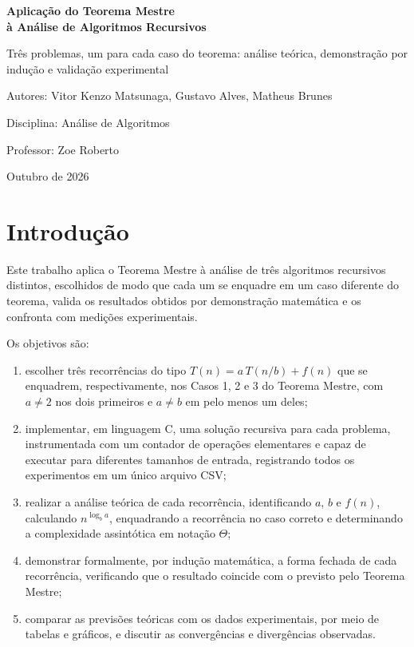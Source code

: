 \documentclass[11pt,a4paper]{article}
\begin{document}
\begin{titlepage}
\centering
\vspace*{3cm}
{\LARGE\bfseries Aplicação do Teorema Mestre\\[0.3em] à Análise de Algoritmos Recursivos\par}
\vspace{0.8cm}
{\large Três problemas, um para cada caso do teorema: análise teórica, demonstração por indução e validação experimental\par}
\vspace{3cm}
{\large Autores: Vitor Kenzo Matsunaga, Gustavo Alves, Matheus Brunes\par}
\vspace{0.4cm}
{\large Disciplina: Análise de Algoritmos\par}
\vspace{0.4cm}
{\large Professor: Zoe Roberto\par}
\vfill
{Outubro de 2026\par}
\end{titlepage}

\tableofcontents
\newpage

\section{Introdução}

Este trabalho aplica o Teorema Mestre à análise de três algoritmos recursivos distintos, escolhidos de modo que cada um se enquadre em um caso diferente do teorema, valida os resultados obtidos por demonstração matemática e os confronta com medições experimentais.

Os objetivos são:

\begin{enumerate}[itemsep=1pt]
  \item escolher três recorrências do tipo $T(n)=a\,T(n/b)+f(n)$ que se enquadrem, respectivamente, nos Casos 1, 2 e 3 do Teorema Mestre, com $a\neq2$ nos dois primeiros e $a\neq b$ em pelo menos um deles;
  \item implementar, em linguagem C, uma solução recursiva para cada problema, instrumentada com um contador de operações elementares e capaz de executar para diferentes tamanhos de entrada, registrando todos os experimentos em um único arquivo CSV;
  \item realizar a análise teórica de cada recorrência, identificando $a$, $b$ e $f(n)$, calculando $n^{\log_b a}$, enquadrando a recorrência no caso correto e determinando a complexidade assintótica em notação $\Theta$;
  \item demonstrar formalmente, por indução matemática, a forma fechada de cada recorrência, verificando que o resultado coincide com o previsto pelo Teorema Mestre;
  \item comparar as previsões teóricas com os dados experimentais, por meio de tabelas e gráficos, e discutir as convergências e divergências observadas.
\end{enumerate}
\end{document}
